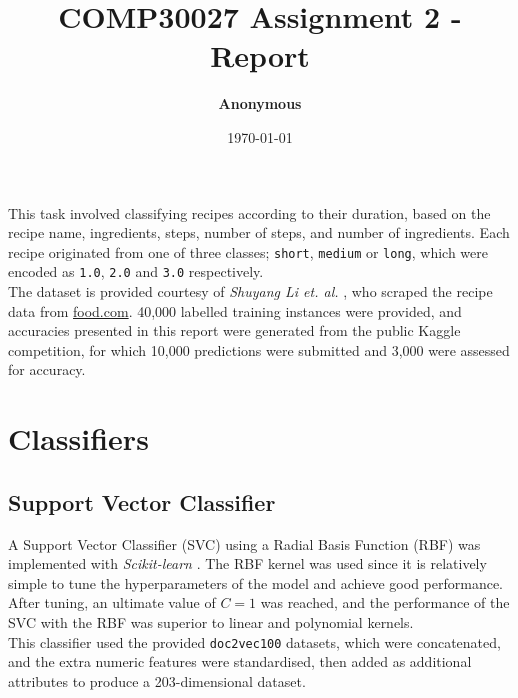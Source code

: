 \documentclass[twocolumn, 11pt]{article}
\title{COMP30027 Assignment 2 - Report}
\date{\today}
\author{\textbf{Anonymous}}
\begin{document}
\maketitle
This task involved classifying recipes according to their duration, based on the recipe name, ingredients, steps, number of steps, and number of ingredients. Each recipe originated from one of three classes; \verb|short|, \verb|medium| or \verb|long|, which were encoded as \verb|1.0|, \verb|2.0| and \verb|3.0| respectively.\\[2mm]
The dataset is provided courtesy of \textit{Shuyang Li et. al.} \cite{majumder2019generating}, who scraped the recipe data from \url{food.com}. 40,000 labelled training instances were provided, and accuracies presented in this report were generated from the public Kaggle competition, for which 10,000 predictions were submitted and 3,000 were assessed for accuracy.
\section{Classifiers}
\subsection{Support Vector Classifier}
\label{sec: SVC}
A Support Vector Classifier (SVC) using a Radial Basis Function (RBF) was implemented with \textit{Scikit-learn} \cite{scikit-learn}. The RBF kernel was used since it is relatively simple to tune the hyperparameters of the model and achieve good performance. After tuning, an ultimate value of $C=1$ was reached, and the performance of the SVC with the RBF was superior to linear and polynomial kernels.\\[2mm]
This classifier used the provided \verb|doc2vec100| datasets, which were concatenated, and the extra numeric features were standardised, then added as additional attributes to produce a 203-dimensional dataset.
\end{document}
